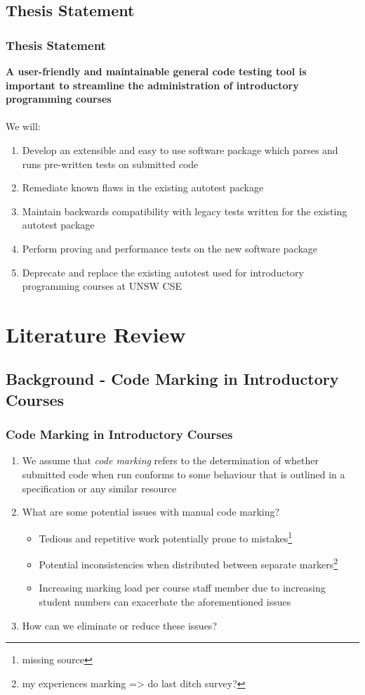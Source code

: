 \documentclass[xcolor]{beamer}
\begin{document}
\subsection{Thesis Statement}
\begin{frame}
	\frametitle{Thesis Statement}
	\textbf{A user-friendly and maintainable general code testing tool is important to streamline the administration of introductory programming courses}
	\\~\\
		\pause
	We will:
		\pause
	\begin{enumerate}
		\item Develop an extensible and easy to use software package which parses and runs pre-written tests on submitted code
			\pause
		\item Remediate known flaws in the existing autotest package
			\pause
		\item Maintain backwards compatibility with legacy tests written for the existing autotest package
			\pause
		\item Perform proving and performance tests on the new software package
			\pause
		\item Deprecate and replace the existing autotest used for introductory programming courses at UNSW CSE
	\end{enumerate}
\end{frame}

\section{Literature Review}
\subsection{Background - Code Marking in Introductory Courses}
\begin{frame}
	\frametitle{Code Marking in Introductory Courses}
	\begin{enumerate}
		\setlength\itemsep{1em}
		\item We assume that \textit{code marking} refers to the determination of whether submitted code when run conforms to some behaviour that is outlined in a specification or any similar resource
			\pause
		\item What are some potential issues with manual code marking?
			\pause
		\begin{itemize}
			\item Tedious and repetitive work potentially prone to mistakes\footnote{missing source}
				\pause
			\item Potential inconsistencies when distributed between separate markers\footnote{my experiences marking => do last ditch survey?}
				\pause
			\item Increasing marking load per course staff member due to increasing student numbers can exacerbate the aforementioned issues
				\pause
		\end{itemize}
		\item How can we eliminate or reduce these issues?
	\end{enumerate}
\end{frame}
\end{document}
